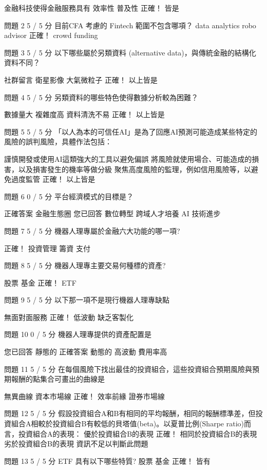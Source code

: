 金融科技使得金融服務具有
  效率性 
  普及性 
正確！
  皆是 
 
問題 2
5 / 5 分
目前CFA 考慮的 Fintech 範圍不包含哪項？
  data analytics 
  robo advisor 
正確！
  crowd funding 
 
問題 3
5 / 5 分
以下哪些屬於另類資料 (alternative data)，與傳統金融的結構化資料不同？

  社群留言 
  衛星影像 
  大氣微粒子 
正確！
  以上皆是 
 
問題 4
5 / 5 分
另類資料的哪些特色使得數據分析較為困難？

  數據量大 
  複雜度高 
  資料清洗不易 
正確！
  以上皆是 
 
問題 5
5 / 5 分
「以人為本的可信任AI」是為了回應AI預測可能造成某些特定的風險的誤判風險，具體作法包括：

  謹慎開發或使用AI這類強大的工具以避免偏誤 
  將風險就使用場合、可能造成的損害，以及損害發生的機率等做分級 
  聚焦高度風險的監理，例如信用風險等，以避免過度監管 
正確！
  以上皆是 
 
問題 6
0 / 5 分
平台經濟模式的目標是？

正確答案
  金融生態圈 
您已回答
  數位轉型 
  跨域人才培養 
  AI 技術進步 
 
問題 7
5 / 5 分
機器人理專屬於金融六大功能的哪一項?

正確！
  投資管理 
  籌資 
  支付 
 
問題 8
5 / 5 分
機器人理專主要交易何種標的資產?

  股票 
  基金 
正確！
  ETF 
 
問題 9
5 / 5 分
以下那一項不是現行機器人理專缺點

  無面對面服務 
正確！
  低波動 
  缺乏客製化 
 
問題 10
0 / 5 分
機器人理專提供的資產配置是

您已回答
  靜態的 
正確答案
  動態的 
  高波動 
  費用率高 
 
問題 11
5 / 5 分
在每個風險下找出最佳的投資組合，這些投資組合預期風險與預期報酬的點集合可畫出的曲線是

  無異曲線 
  資本市場線 
正確！
  效率前緣 
  證券市場線 
 
問題 12
5 / 5 分
假設投資組合A和B有相同的平均報酬，相同的報酬標準差，但投資組合A相較於投資組合B有較低的貝塔值(beta)。以夏普比例(Sharpe ratio)而言，投資組合A的表現：
  優於投資組合B的表現 
正確！
  相同於投資組合B的表現 
  劣於投資組合B的表現 
  資訊不足以判斷此問題 
 
問題 13
5 / 5 分
ETF 具有以下哪些特質?
  股票 
  基金 
正確！
  皆有 
 
